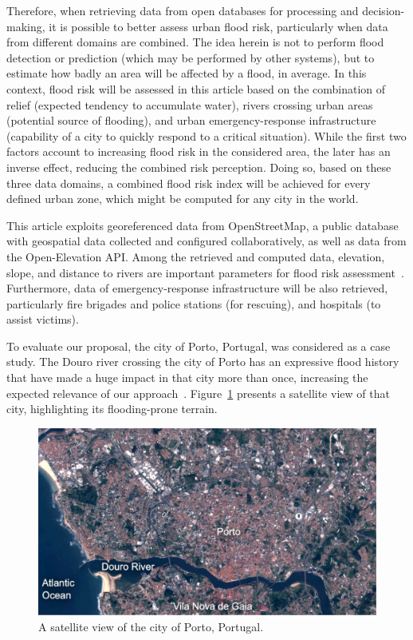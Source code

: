 \begin{refsection}
Therefore, when retrieving data from open databases for processing and decision-making, it is possible to better assess urban flood risk, particularly when data from different domains are combined. The idea herein is not to perform flood detection or prediction (which may be performed by other systems), but to estimate how badly an area will be affected by a flood, in average. In this context, flood risk will be assessed in this article based on the combination of relief (expected tendency to accumulate water), rivers crossing urban areas (potential source of flooding), and urban emergency-response infrastructure (capability of a city to quickly respond to a critical situation). While the first two factors account to increasing flood risk in the considered area, the later has an inverse effect, reducing the combined risk perception. Doing so, based on these three data domains, a combined flood risk index will be achieved for every defined urban zone, which might be computed for any city in the world.

This article exploits georeferenced data from OpenStreetMap, a public database with geospatial data collected and configured collaboratively, as well as data from the Open-Elevation API. Among the retrieved and computed data, elevation, slope, and distance to rivers are important parameters for flood risk assessment~\cite{elevation1}. Furthermore, data of emergency-response infrastructure will be also retrieved, particularly fire brigades and police stations (for rescuing), and hospitals (to assist victims). 

To evaluate our proposal, the city of Porto, Portugal, was considered as a case study. The Douro river crossing the city of Porto has an expressive flood history that have made a huge impact in that city more than once, increasing the expected relevance of our approach~\cite{dourohistory}. Figure~\ref{fig:porto_douro} presents a satellite view of that city, highlighting its flooding-prone terrain.

\begin{figure}[ht]
  \centering
  \includegraphics[width=0.9\linewidth]{Chapters/6-Flood/figs/porto_satellite.pdf}
  \caption{A satellite view of the city of Porto, Portugal.}\label{fig:porto_douro}
\end{figure}


\end{refsection}
